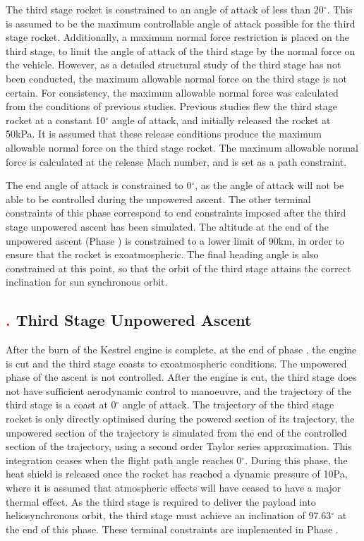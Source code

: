 The third stage rocket is constrained to an angle of attack of less than 20$^\circ$. This is assumed to be the maximum controllable angle of attack possible for the third stage rocket.   
Additionally, a maximum normal force restriction is placed on the third stage, to limit the angle of attack of the third stage by the normal force on the vehicle. However, as a detailed structural study of the third stage has not been conducted, the maximum allowable normal force on the third stage is not certain.
For consistency, the maximum allowable normal force was calculated from the conditions of previous studies. Previous studies flew the third stage rocket at a constant 10$^\circ$ angle of attack, and initially released the rocket at 50kPa\cite{Preller2017b}. 
It is assumed that these release conditions produce the maximum allowable normal force on the third stage rocket. The maximum allowable normal force is calculated at the release Mach number, and is set as a path constraint. 

The end angle of attack is constrained to 0$^\circ$, as the angle of attack will not be able to be controlled during the unpowered ascent. 
The other terminal constraints of this phase correspond to end constraints imposed after the third stage unpowered ascent has been simulated. The altitude at the end of the unpowered ascent (Phase \textcolor{red}{}) is constrained to a lower limit of 90km, in order to ensure that the rocket is exoatmospheric. The final heading angle is also constrained at this point, so that the orbit of the third stage attains the correct inclination for sun synchronous orbit. 


\subsection{\textcolor{red}{.} Third Stage Unpowered Ascent}
After the burn of the Kestrel engine is complete, at the end of phase \textcolor{red}{}, the engine is cut and the third stage coasts to exoatmospheric conditions. 
The unpowered phase of the ascent is not controlled. After the engine is cut, the third stage does not have sufficient aerodynamic control to manoeuvre, and the trajectory of the third stage is a coast at 0$^\circ$ angle of attack. The trajectory of the third stage rocket is only directly optimised during the powered section of its trajectory, the unpowered section of the trajectory is simulated from the end of the controlled section of the trajectory, using a second order Taylor series approximation. This integration ceases when the flight path angle reaches 0$^{\circ}$.
During this phase, the heat shield is released once the rocket has reached a dynamic pressure of 10Pa, where it is assumed that atmospheric effects will have ceased to have a major thermal effect.  As the third stage is required to deliver the payload into heliosynchronous orbit, the third stage must achieve an inclination of 97.63$^\circ$ at the end of this phase\cite{Boain2004}. These terminal constraints are implemented in Phase \textcolor{red}{}.



